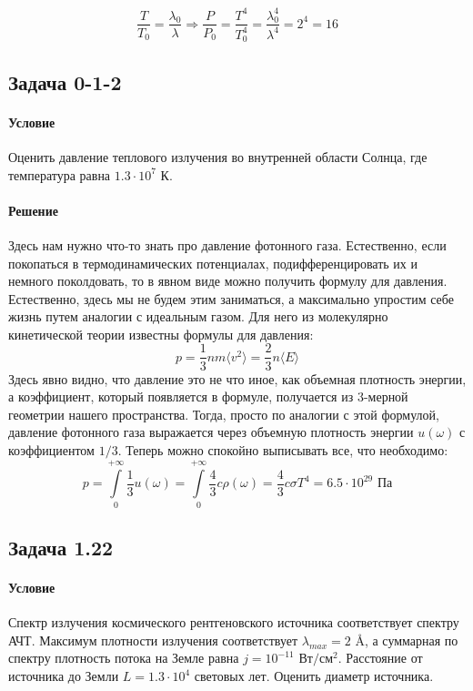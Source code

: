 \documentclass[12pt]{article}
\begin{document}
\begin{equation*}
    \dfrac{T}{T_0} = \dfrac{\lambda_0}{\lambda} \Rightarrow \dfrac{P}{P_0} = \dfrac{T^4}{T^4_0} = \dfrac{\lambda^4_0}{\lambda^4} = 2^4 =16 
\end{equation*}

\subsection{Задача 0-1-2}
\label{task_012}
\paragraph{Условие}
Оценить давление теплового излучения во внутренней области Солнца, где температура равна $1.3\cdot 10^7$ К.
\paragraph{Решение}
Здесь нам нужно что-то знать про давление фотонного газа. Естественно,  если покопаться в термодинамических потенциалах, подифференцировать их и немного поколдовать, то в явном виде можно получить формулу для давления. Естественно, здесь мы не будем этим заниматься, а максимально упростим себе жизнь путем аналогии с идеальным газом. Для него из молекулярно кинетической теории известны формулы для давления:
\begin{equation*}
    p=\dfrac{1}{3}nm\langle v^2\rangle = \dfrac{2}{3} n \langle E \rangle
\end{equation*}
Здесь явно видно, что давление это не что иное, как объемная плотность энергии, а коэффициент, который появляется в формуле, получается из 3-мерной геометрии нашего пространства. Тогда, просто по аналогии с этой формулой, давление фотонного газа выражается через объемную плотность энергии $u(\omega)$ с коэффициентом $1/3$. Теперь можно спокойно выписывать все, что необходимо:
\begin{equation*}
    p=\int\limits_0^{+\infty}\dfrac{1}{3}u(\omega) = \int\limits_0^{+\infty}\dfrac{4}{3}c\rho(\omega) = \dfrac{4}{3}c\sigma T^4 = 6.5\cdot 10^{29} \text{ Па}
\end{equation*}
\subsection{Задача 1.22}
\label{task_122}
\paragraph{Условие}
Спектр излучения космического рентгеновского источника соответствует спектру АЧТ. Максимум плотности излучения соответствует $\lambda_{max} = 2$ \AA, а суммарная по спектру плотность потока на Земле равна $j = 10^{-11} \text{ Вт}/\text{см}^2$. Расстояние от источника до Земли $L = 1.3\cdot 10^4$ световых лет. Оценить диаметр источника. 
\end{document}
